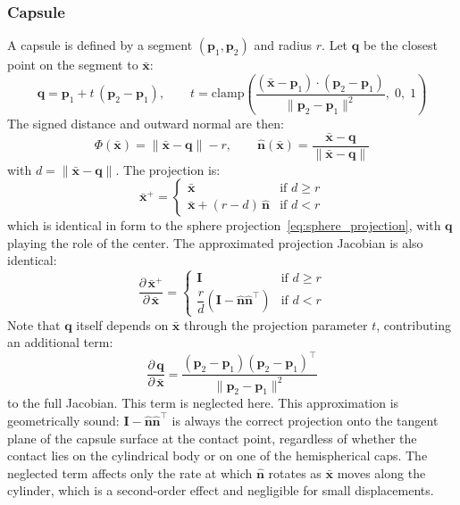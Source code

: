 \documentclass{article}
\newcommand{\pd}[2]{\dfrac{\partial\, #1}{\partial\, #2}}
\begin{document}
\subsubsection{Capsule}
A capsule is defined by a segment $(\mathbf{p}_1, \mathbf{p}_2)$ and radius $r$. Let $\mathbf{q}$ be the closest point on the segment to $\bar{\mathbf{x}}$:
\begin{equation*}
    \mathbf{q} = \mathbf{p}_1 + t\,(\mathbf{p}_2 - \mathbf{p}_1),
    \qquad
    t = \mathrm{clamp}\!\left(
        \frac{(\bar{\mathbf{x}} - \mathbf{p}_1)\cdot(\mathbf{p}_2 - \mathbf{p}_1)}
             {\|\mathbf{p}_2 - \mathbf{p}_1\|^2},\; 0,\; 1
    \right)
\end{equation*}
The signed distance and outward normal are then:
\begin{equation*}
    \Phi(\bar{\mathbf{x}}) = \|\bar{\mathbf{x}} - \mathbf{q}\| - r,
    \qquad
    \hat{\mathbf{n}}(\bar{\mathbf{x}}) = \frac{\bar{\mathbf{x}} - \mathbf{q}}{\|\bar{\mathbf{x}} - \mathbf{q}\|}
\end{equation*}
with $d = \|\bar{\mathbf{x}} - \mathbf{q}\|$. The projection is:
\begin{equation}
\label{eq:capsule_projection}
    \bar{\mathbf{x}}^+ = \begin{cases}
        \bar{\mathbf{x}} & \text{if } d \geq r \\
        \bar{\mathbf{x}} + (r - d)\,\hat{\mathbf{n}} & \text{if } d < r
    \end{cases}
\end{equation}
which is identical in form to the sphere projection~\eqref{eq:sphere_projection}, with $\mathbf{q}$ playing the role of the center. The approximated projection Jacobian is
also identical:
\begin{equation}
    \pd{\bar{\mathbf{x}}^+}{\bar{\mathbf{x}}} =
    \begin{cases}
        \mathbf{I} & \text{if } d \geq r \\[1ex]
        \dfrac{r}{d}\left(\mathbf{I} - \hat{\mathbf{n}}\hat{\mathbf{n}}^\top\right) & \text{if } d < r
    \end{cases}
\end{equation}
Note that $\mathbf{q}$ itself depends on $\bar{\mathbf{x}}$ through the projection parameter $t$, contributing an additional term:
\begin{equation*}
    \pd{\mathbf{q}}{\bar{\mathbf{x}}} = \frac{(\mathbf{p}_2 - \mathbf{p}_1)(\mathbf{p}_2 - \mathbf{p}_1)^\top}{\|\mathbf{p}_2 - \mathbf{p}_1\|^2}
\end{equation*}
to the full Jacobian. This term is neglected here. This approximation is geometrically sound: $\mathbf{I} - \hat{\mathbf{n}}\hat{\mathbf{n}}^\top$ is always the correct projection onto the tangent plane of the capsule surface at the contact point, regardless of whether the contact lies on the cylindrical body or on one of the hemispherical caps. The neglected term affects only the rate at which $\hat{\mathbf{n}}$ rotates as $\bar{\mathbf{x}}$ moves along the cylinder, which is a second-order effect and negligible for small displacements.
\end{document}
